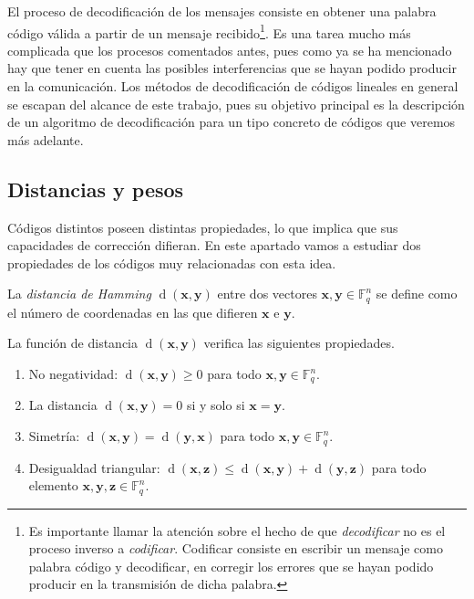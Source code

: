 El proceso de decodificación de los mensajes consiste en obtener una palabra código válida a partir de un mensaje recibido\footnote{Es importante llamar la atención sobre el hecho de que \textit{decodificar} no es el proceso inverso a \textit{codificar}. Codificar consiste en escribir un mensaje como palabra código y decodificar, en corregir los errores que se hayan podido producir en la transmisión de dicha palabra.}. 
Es una tarea mucho más complicada que los procesos comentados antes, pues como ya se ha mencionado hay que tener en cuenta las posibles interferencias que se hayan podido producir en la comunicación.
Los métodos de decodificación de códigos lineales en general se escapan del alcance de este trabajo, pues su objetivo principal es la descripción de un algoritmo de decodificación para un tipo concreto de códigos que veremos más adelante.

\subsection{Distancias y pesos}


Códigos distintos poseen distintas propiedades, lo que implica que sus capacidades de corrección difieran.
En este apartado vamos a estudiar dos propiedades de los códigos 
muy relacionadas con esta idea.

\begin{definition}
  La \textit{distancia de Hamming} \(\operatorname{d}(\symbf{x}, \symbf{y})\) entre dos vectores \(\symbf{x}, \symbf{y} \in \mathbb F_q^n\) se define como el número de coordenadas en las que difieren \(\symbf{x}\) e \(\symbf{y}\).
\end{definition}

\begin{theorem}
  La función de distancia \(\operatorname{d}(\symbf{x}, \symbf{y})\) verifica las siguientes propiedades.
  \begin{enumerate}
    \item No negatividad: \(\operatorname{d}(\symbf{x}, \symbf{y}) \geq 0\) para todo \(\symbf{x}, \symbf{y}\in \mathbb F_q^n\).
    \item La distancia \(\operatorname{d}(\symbf{x}, \symbf{y}) = 0\) si y solo si \(\symbf{x} = \symbf{y}\).
    \item Simetría: \(\operatorname{d}(\symbf{x}, \symbf{y}) = \operatorname{d}(\symbf{y}, \symbf{x})\) para todo \(\symbf{x}, \symbf{y}\in \mathbb F_q^n\).
    \item Desigualdad triangular: \(\operatorname{d}(\symbf{x}, \symbf{z}) \leq \operatorname{d}(\symbf{x}, \symbf{y}) + \operatorname{d}(\symbf{y}, \symbf{z})\) para todo elemento \(\symbf{x}, \symbf{y}, \symbf{z}\in \mathbb F_q^n\).
  \end{enumerate}
\end{theorem}

